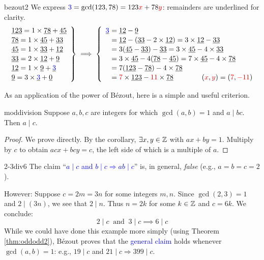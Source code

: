 \begin{example}{}{bezout2}
	We express $\textcolor{blue}{3}=\gcd(123,78) =123\textcolor{red}{x}+78\textcolor{red}{y}$: remainders are underlined for clarity.
  \[
  	\def\arraystretch{1.1}
  	\def\ul#1{\underline{#1}}
	  \left.
	  \begin{array}{l}
			\ul{123}=1\times \ul{78}+\ul{45}\\
			\ul{78}=1\times \ul{45}+\ul{33}\\
			\ul{45}=1\times \ul{33}+\ul{12}\\
			\ul{33}=2\times \ul{12}+\ul 9\\
			\ul{12}=1\times \ul 9+\ul{\textcolor{blue}{3}}\\
			\ul 9=3\times \ul{\textcolor{blue}{3}}+\ul 0
	  \end{array}
	  \right\}
	  \implies
	  \left\{
	  \begin{array}{r@{\,\,}l}
			\ul{\textcolor{blue}{3}}&=\ul{12}-\ul 9\\
			&=\ul{12}-(\ul{33}-2\times \ul{12}) =3\times \ul{12}-\ul{33}\\
			&=3(\ul{45}-\ul{33})-\ul{33} =3\times \ul{45}-4\times \ul{33}\\
			&=3\times \ul{45}-4(\ul{78}-\ul{45}) =7\times \ul{45}-4\times \ul{78}\\
			&=7(\ul{123}-\ul{78})-4\times \ul{78}\\
		  &=\textcolor{red}{7}\times \ul{123}-\textcolor{red}{11}\times \ul{78} %
		  \qquad\qquad (\textcolor{red}{x},\textcolor{red}{y})=(\textcolor{red}{7},\textcolor{red}{-11})
	  \end{array}
	  \right.
  \]
\end{example}

As an application of the power of Bézout, here is a simple and useful criterion.

\begin{cor}{}{moddivision}
	Suppose $a,b,c$ are integers for which $\gcd(a,b)=1$ and $a\mid bc$. Then $a\mid c$.
\end{cor}

\begin{proof}
	We prove directly. By the corollary, $\exists x,y\in\mathbb{Z}$ with $ax+by=1$. Multiply by $c$ to obtain $ac x+bc y=c$, the left side of which is a multiple of $a$.
\end{proof}

\begin{example}{}{2-3div6}
	The claim ``\textcolor{blue}{$a\mid c$ and $b\mid c\Longrightarrow ab\mid c$}'' is, in general, \emph{false} (e.g., $a=b=c=2$).\par
	However: Suppose $c=2m=3n$ for some integers $m,n$. Since $\gcd(2,3)=1$ and $2\mid(3n)$, we see that $2\mid n$. Thus $n=2k$ for some $k\in\mathbb{Z}$ and $c=6k$. We conclude:
	\[
		2\mid c\ \text{ and }\ 3\mid c\implies 6\mid c
	\]
	While we could have done this example more simply (using Theorem \ref{thm:oddodd2}), Bézout proves that the \textcolor{blue}{general claim} holds whenever $\gcd(a,b)=1$: e.g., $19\mid c$ and $21\mid c\Longrightarrow 399\mid c$.
\end{example}

